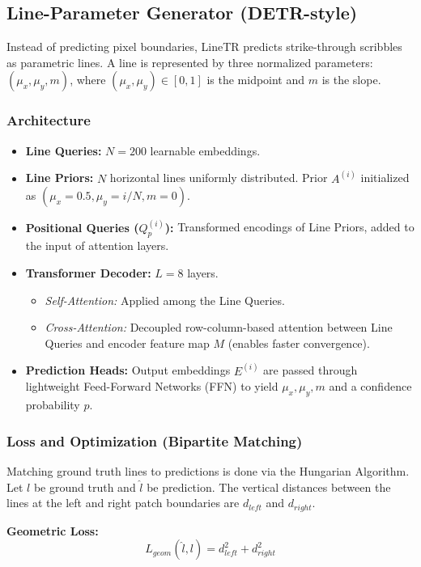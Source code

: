 \documentclass[12pt,a4paper]{article}
\begin{document}
\subsection{Line-Parameter Generator (DETR-style)}
Instead of predicting pixel boundaries, LineTR predicts strike-through scribbles as parametric lines. A line is represented by three normalized parameters: $(\mu_x, \mu_y, m)$, where $(\mu_x, \mu_y) \in [0, 1]$ is the midpoint and $m$ is the slope.

\subsubsection{Architecture}
\begin{itemize}
    \item \textbf{Line Queries:} $N = 200$ learnable embeddings.
    \item \textbf{Line Priors:} $N$ horizontal lines uniformly distributed. Prior $A^{(i)}$ initialized as $(\mu_x=0.5, \mu_y=i/N, m=0)$.
    \item \textbf{Positional Queries ($Q_p^{(i)}$):} Transformed encodings of Line Priors, added to the input of attention layers.
    \item \textbf{Transformer Decoder:} $L = 8$ layers.
    \begin{itemize}
        \item \textit{Self-Attention:} Applied among the Line Queries.
        \item \textit{Cross-Attention:} Decoupled row-column-based attention between Line Queries and encoder feature map $M$ (enables faster convergence).
    \end{itemize}
    \item \textbf{Prediction Heads:} Output embeddings $E^{(i)}$ are passed through lightweight Feed-Forward Networks (FFN) to yield $\mu_x, \mu_y, m$ and a confidence probability $p$.
\end{itemize}

\subsubsection{Loss and Optimization (Bipartite Matching)}
Matching ground truth lines to predictions is done via the Hungarian Algorithm. 
Let $l$ be ground truth and $\hat{l}$ be prediction. The vertical distances between the lines at the left and right patch boundaries are $d_{left}$ and $d_{right}$.

\textbf{Geometric Loss:}
\begin{equation}
    L_{geom}(\hat{l}, l) = d_{left}^2 + d_{right}^2
\end{equation}
\end{document}
